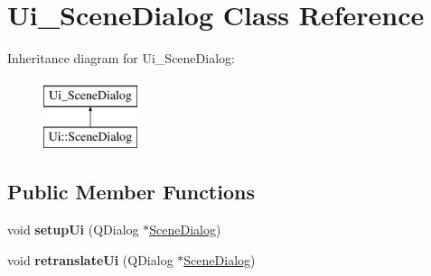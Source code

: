 \hypertarget{classUi__SceneDialog}{\section{Ui\-\_\-\-Scene\-Dialog Class Reference}
\label{classUi__SceneDialog}
}
Inheritance diagram for Ui\-\_\-\-Scene\-Dialog\-:\begin{figure}[H]
\begin{center}
\leavevmode
\includegraphics[height=2.000000cm]{classUi__SceneDialog}
\end{center}
\end{figure}
\subsection*{Public Member Functions}
\begin{DoxyCompactItemize}
\item 
\hypertarget{classUi__SceneDialog_a57bf95f881c27fd2fc2a8fdb9505f977}{void {\bfseries setup\-Ui} (Q\-Dialog $\ast$\hyperlink{classSceneDialog}{Scene\-Dialog})}\label{classUi__SceneDialog_a57bf95f881c27fd2fc2a8fdb9505f977}

\item 
\hypertarget{classUi__SceneDialog_a2e8cb0003e1d5f443bb3337d3237fabd}{void {\bfseries retranslate\-Ui} (Q\-Dialog $\ast$\hyperlink{classSceneDialog}{Scene\-Dialog})}\label{classUi__SceneDialog_a2e8cb0003e1d5f443bb3337d3237fabd}

\end{DoxyCompactItemize}
